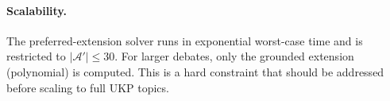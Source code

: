 \documentclass[runningheads]{llncs}
\begin{document}
\paragraph{Scalability.} The preferred-extension solver runs in exponential
worst-case time and is restricted to $|\mathcal{A}'| \leq 30$. For
larger debates, only the grounded extension (polynomial) is computed.
This is a hard constraint that should be addressed before scaling to full
UKP topics.



\end{document}
